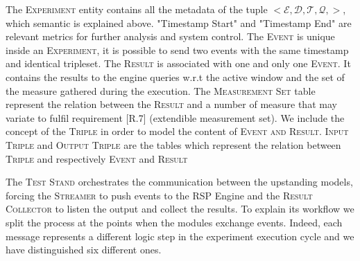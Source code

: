 The \textsc{Experiment} entity contains all the metadata of the tuple $<\mathcal{E},\mathcal{D},\mathcal{T},\mathcal{Q},>$, which semantic is explained above. "Timestamp Start" and "Timestamp End" are relevant metrics for further analysis and system control. 
The \textsc{Event} is unique inside an \textsc{Experiment}, it is possible to send two events with the same timestamp and identical tripleset. The \textsc{Result}  is associated with one and only one \textsc{Event}. It contains the results to the engine queries w.r.t the active window and the set of the measure gathered during the execution. The \textsc{Measurement Set} table represent the relation between the \textsc{Result} and a number of measure that may variate  to fulfil requirement [R.7] (extendible measurement set). We include the concept of the \textsc{Triple} in order to model the content of \textsc{Event and Result}. \textsc{Input Triple} and \textsc{Output Triple} are the tables which represent the relation between \textsc{Triple} and respectively \textsc{Event} and \textsc{Result}

\noindent The \textsc{Test Stand} orchestrates the communication between the upstanding models, forcing the \textsc{Streamer} to push events to the RSP Engine and the \textsc{Result Collector} to listen the output and collect the results.  To explain its workflow we split the process at the points when the modules exchange events. Indeed, each message represents a different logic step in the experiment execution cycle and we have distinguished six different ones.

